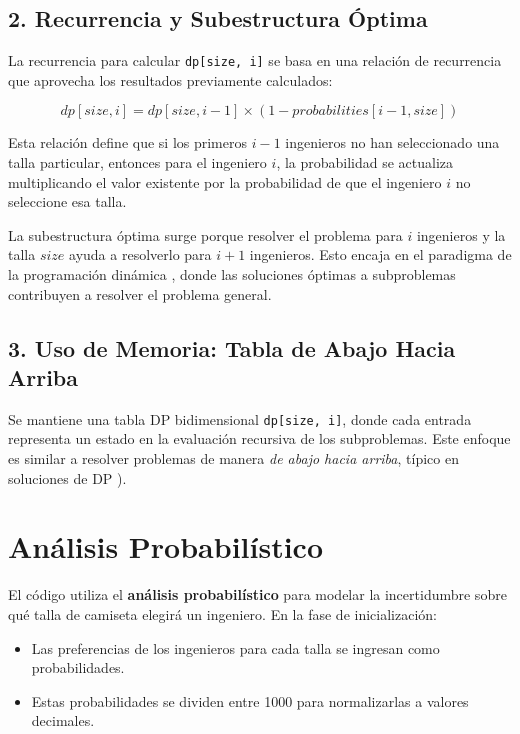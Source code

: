 \documentclass{article}
\begin{document}
\subsection*{2. Recurrencia y Subestructura Óptima}

La recurrencia para calcular \texttt{dp[size, i]} se basa en una relación de recurrencia que aprovecha los resultados previamente calculados:

\[
dp[size, i] = dp[size, i - 1] \times (1 - probabilities[i - 1, size])
\]

Esta relación define que si los primeros $i-1$ ingenieros no han seleccionado una talla particular, entonces para el ingeniero $i$, la probabilidad se actualiza multiplicando el valor existente por la probabilidad de que el ingeniero $i$ no seleccione esa talla.

La subestructura óptima surge porque resolver el problema para $i$ ingenieros y la talla $size$ ayuda a resolverlo para $i+1$ ingenieros. Esto encaja en el paradigma de la programación dinámica , donde las soluciones óptimas a subproblemas contribuyen a resolver el problema general.

\subsection*{3. Uso de Memoria: Tabla de Abajo Hacia Arriba}

Se mantiene una tabla DP bidimensional \texttt{dp[size, i]}, donde cada entrada representa un estado en la evaluación recursiva de los subproblemas. Este enfoque es similar a resolver problemas de manera \textit{de abajo hacia arriba}, típico en soluciones de DP ).

\section*{Análisis Probabilístico}

El código utiliza el \textbf{análisis probabilístico} para modelar la incertidumbre sobre qué talla de camiseta elegirá un ingeniero. En la fase de inicialización:

\begin{itemize}
    \item Las preferencias de los ingenieros para cada talla se ingresan como probabilidades.
    \item Estas probabilidades se dividen entre 1000 para normalizarlas a valores decimales.
\end{itemize}
\end{document}
